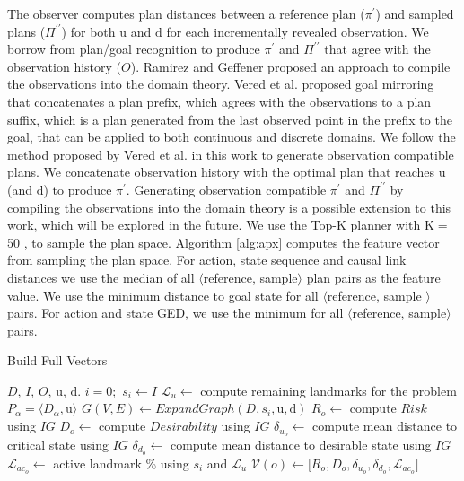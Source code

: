 \documentclass[letterpaper]{article}
\theoremstyle{plain}
\begin{document}
The observer computes plan distances between a reference plan ($\pi^\prime$) and sampled plans ($\Pi^{\prime\prime}$) for both $\mathrm{u}$ and $\mathrm{d}$ for each incrementally revealed observation. We borrow from plan/goal recognition to produce $\pi^\prime$ and $\Pi^{\prime\prime}$ that agree with the observation history ($O$). Ramirez and Geffener  proposed an approach to compile the observations into the domain theory. Vered et al.  proposed goal mirroring that concatenates a plan prefix, which agrees with the observations to a plan suffix, which is a plan generated from the last observed point in the prefix to the goal, that can be applied to both continuous and discrete domains. We follow the method proposed by Vered et al.  in this work to generate observation compatible plans. We concatenate observation history with the optimal plan that reaches $\mathrm{u}$ (and $\mathrm{d}$) to produce $\pi^\prime$. Generating observation compatible $\pi^\prime$ and $\Pi^{\prime\prime}$ by compiling the observations into the domain theory is a possible extension to this work, which will be explored in the future. We use the Top-K planner with K$=$50 \cite{riabov2014}, to sample the plan space. Algorithm \ref{alg:apx} computes the feature vector from sampling the plan space. For action, state sequence and causal link distances we use the median of all $\langle$reference, sample$\rangle$ plan pairs as the feature value. We use the minimum distance to goal state for all $\langle$reference, sample $\rangle$ pairs. For action and state GED, we use the minimum for all $\langle$reference, sample$\rangle$ pairs.
\vspace{-2mm}
\begin{algorithm}[tb]
        \caption{Build Full Vectors}
        \label{alg:exact}
        \begin{algorithmic}[1]
                \Require $D$, $I$, $O$, $\mathrm{u}$, $\mathrm{d}$.
                \State $i=0;$ $ s_i \gets I$
                \State $\mathcal{L}_{u} \gets$ compute remaining landmarks for the problem $P_\alpha=\langle D_\alpha, \mathrm{u}\rangle$
                        \State $G(V,E) \gets ExpandGraph(D,s_i,\mathrm{u},\mathrm{d})$
                        \State $R_o \gets$ compute $Risk$ using $IG$
                        \State $D_o \gets$ compute $Desirability$ using $IG$
                        \State $\delta_{u_o} \gets$ compute mean distance to critical state using $IG$
                        \State $\delta_{d_o} \gets$ compute mean distance to desirable state using $IG$
                        \State $\mathcal{L}_{{ac}_o} \gets$ active landmark \% using $s_i$ and  $\mathcal{L}_{u}$
                        \State $\mathcal{V}(o) \gets \lbrack R_o,D_o,\delta_{u_o}, \delta_{d_o}, \mathcal{L}_{{ac}_o}\rbrack$
                \EndFor
                \EndProcedure
        \end{algorithmic}
\end{algorithm}
\end{document}
